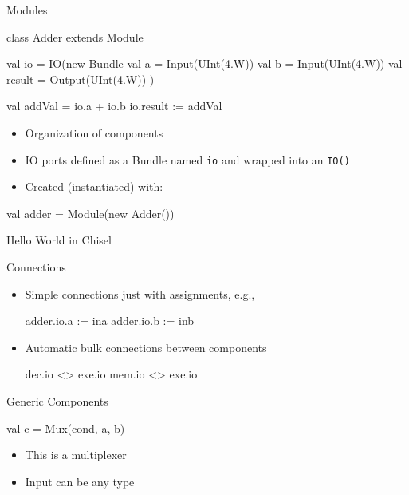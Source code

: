 \documentclass[xcolor=pdflatex,dvipsnames,table]{beamer}
\newcommand{\code}[1]{{\texttt{#1}}}
\begin{document}
\begin{frame}[fragile]{Modules}
\begin{chisel}
class Adder extends Module {
  val io = IO(new Bundle {
    val a = Input(UInt(4.W))
    val b = Input(UInt(4.W))
    val result = Output(UInt(4.W))
  })

  val addVal = io.a + io.b
  io.result := addVal
}
\end{chisel}
\begin{itemize}
\item Organization of components
\item IO ports defined as a Bundle named \code{io} and wrapped into an \code{IO()}
\item Created (instantiated) with:
\end{itemize}
\begin{chisel}
val adder = Module(new Adder())
\end{chisel}
\end{frame}

\begin{frame}[fragile]{Hello World in Chisel}
\end{frame}

\begin{frame}[fragile]{Connections}
\begin{itemize}
\item Simple connections just with assignments, e.g.,
\begin{chisel}
  adder.io.a := ina
  adder.io.b := inb
\end{chisel}
\item Automatic bulk connections between components
\begin{chisel}
  dec.io <> exe.io
  mem.io <> exe.io
\end{chisel}
\end{itemize}
\end{frame}

\begin{frame}[fragile]{Generic Components}
\begin{chisel}
val c = Mux(cond, a, b)
\end{chisel}
\begin{itemize}
\item This is a multiplexer
\item Input can be any type
\end{itemize}
\end{frame}
\end{document}
